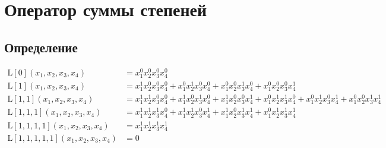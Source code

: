
\section{Оператор суммы степеней}

\subsection{Определение}

\begin{equation*} \begin{aligned}
\mathrm{L}[0]{\left( x_1, x_2, x_3, x_4 \right)} &=
  x_1^0 x_2^0 x_3^0 x_4^0
\\
\mathrm{L}[1]{\left( x_1, x_2, x_3, x_4 \right)} &=
  x_1^1 x_2^0 x_3^0 x_4^0
+ x_1^0 x_2^1 x_3^0 x_4^0
+ x_1^0 x_2^0 x_3^1 x_4^0
+ x_1^0 x_2^0 x_3^0 x_4^1
\\
\mathrm{L}[1, 1]{\left( x_1, x_2, x_3, x_4 \right)} &=
  x_1^1 x_2^1 x_3^0 x_4^0
+ x_1^1 x_2^0 x_3^1 x_4^0
+ x_1^1 x_2^0 x_3^0 x_4^1
+ x_1^0 x_2^1 x_3^1 x_4^0
+ x_1^0 x_2^1 x_3^0 x_4^1
+ x_1^0 x_2^0 x_3^1 x_4^1
\\
\mathrm{L}[1, 1, 1]{\left( x_1, x_2, x_3, x_4 \right)} &=
  x_1^1 x_2^1 x_3^1 x_4^0
+ x_1^1 x_2^1 x_3^0 x_4^1
+ x_1^1 x_2^0 x_3^1 x_4^1
+ x_1^0 x_2^1 x_3^1 x_4^1
\\
\mathrm{L}[1, 1, 1, 1]{\left( x_1, x_2, x_3, x_4 \right)} &=
  x_1^1 x_2^1 x_3^1 x_4^1
\\
\mathrm{L}[1, 1, 1, 1, 1]{\left( x_1, x_2, x_3, x_4 \right)} &=
  0
\\
\end{aligned} \end{equation*}

